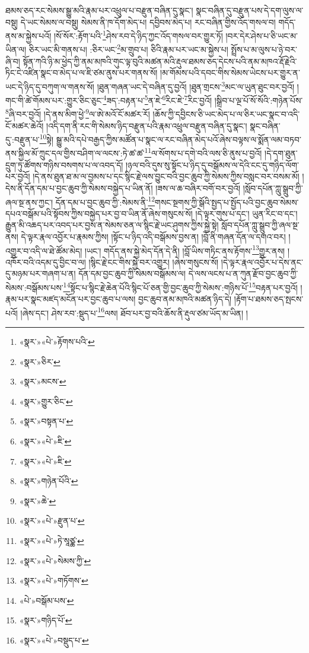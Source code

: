 ཐམས་ཅད་རང་སེམས་སྒྱུ་མའི་རྣམ་པར་འཕྲུལ་པ་བརྫུན་བཞིན་དུ་སྣང་། སྣང་བཞིན་དུ་བརྫུན་པས་དེ་དག་ལུས་ལ་བསྡུ། དེ་ཡང་སེམས་ལ་བསྡུ། སེམས་ནི་ཁ་དོག་མེད་པ། དབྱིབས་མེད་པ། རང་བཞིན་གྱིས་འོད་གསལ་བ། གདོད་ནས་མ་སྐྱེས་པའོ། །སོ་སོར་:རྟོག་པའི་\footnote{«སྣར་»«པེ་»རྟོགས་པའི་}ཤེས་རབ་དེ་ཉིད་ཀྱང་འོད་གསལ་བར་གྱུར་ཏོ། །བར་དེར་ཤེས་པ་ཅི་ཡང་མ་ཡིན་ལ། ཅིར་ཡང་མི་གནས་པ། :ཅིར་ཡང་\footnote{«སྣར་»ཅིར་}མ་གྲུབ་པ། ཅིའི་རྣམ་པར་ཡང་མ་སྐྱེས་པ། སྤྲོས་པ་མ་ལུས་པ་ཉེ་བར་ཞི་བ། སྟོན་ཀའི་ཉི་མ་ཕྱེད་ཀྱི་ནམ་མཁའི་གུང་ལྟ་བུའི་མཚན་མའི་རྡུལ་ཐམས་ཅད་དེངས་པའི་ནམ་མཁའ་རྡོ་རྗེའི་ཏིང་ངེ་འཛིན་སྣང་བ་མེད་པ་ལ་ཇི་ཙམ་ནུས་པར་གནས་སོ། །མ་གོམས་པའི་དབང་གིས་སེམས་ཡེངས་པར་གྱུར་ན་ཡང་དེ་ཉིད་དུ་བཀུག་ལ་གནས་སོ། །ཐུན་གཞན་ཡང་དེ་བཞིན་དུ་བྱའོ། །ཐུན་གྲངས་\footnote{«སྣར་»མངས་}མང་ལ་ཡུན་ཐུང་བར་བྱའོ། །གང་གི་ཚེ་གོམས་པར་:གྱུར་ཅིང་ཅུང་\footnote{«སྣར་»གྱུར་ཅིང་}ཟད་:བརྟན་པ་\footnote{«སྣར་»བསྟན་པ་}ན་ཇེ་\footnote{«སྣར་»«པེ་»ཇི་}རིང་ཇེ་\footnote{«སྣར་»«པེ་»ཇི་}རིང་བྱའོ། །སྒྲིབ་པ་ལྔ་པོ་སོ་སོའི་:གཉེན་པོས་\footnote{«སྣར་»གཉེན་པོའི་}ཞི་བར་བྱའོ། །དེ་ནས་མིག་ཕྱེ་\footnote{«སྣར་»ཆེ་}ལ་ཨེ་མའོ་ངོ་མཚར་རོ། །ཆོས་ཀྱི་དབྱིངས་ཅི་ཡང་མེད་པ་ལ་ཅིར་ཡང་སྣང་བ་འདི་ངོ་མཚར་ཆེའོ། །འདི་དག་ནི་རང་གི་སེམས་ཉིད་བརྫུན་པའི་རྣམ་འཕྲུལ་བརྫུན་བཞིན་དུ་སྣང་། སྣང་བཞིན་དུ་:བརྫུན་པ་\footnote{«སྣར་»«པེ་»རྫུན་པ་}སྟེ། སྒྱུ་མའི་དཔེ་བརྒྱད་ཀྱིས་མཚོན་པ་སྣང་ལ་རང་བཞིན་མེད་པའོ་ཞེས་བལྟས་ལ་སྨོན་ལམ་བཏབ་ནས་སྐྱིལ་མོ་ཀྲུང་དལ་གྱིས་བཤིག་ལ་ལངས་:ཏེ་ཚ་ཚ་\footnote{«སྣར་»«པེ་»ཏེ་སཱཙྪ་}ལ་སོགས་པ་དགེ་བའི་ལས་ཅི་ནུས་པ་བྱའོ། །དེ་དག་ཐུན་དྲུག་ཏུ་ཚོགས་གཉིས་བསགས་པ་ལ་འབད་དོ། །ཉལ་བའི་དུས་སུ་སྟོང་པ་ཉིད་དུ་བསྒོམས་ལ་དེའི་ངང་དུ་གཉིད་ལོག་པར་བྱའོ། །དེ་ནས་ཐུན་ཐ་མ་ལ་བྱམས་པ་དང་སྙིང་རྗེ་ལས་བྱུང་བའི་བྱང་ཆུབ་ཀྱི་སེམས་ཀྱིས་བསླང་བར་བསམ་མོ། །དེས་ནི་དོན་དམ་པ་བྱང་ཆུབ་ཀྱི་སེམས་བསྐྱེད་པ་ཡིན་ནོ། །ཟས་ལ་ཆ་བཞིར་བགོ་བར་བྱའོ། །སློབ་དཔོན་ཀླུ་སྒྲུབ་ཀྱི་ཞལ་སྔ་ནས་ཀྱང་། དོན་དམ་པ་བྱང་ཆུབ་ཀྱི་:སེམས་ནི་\footnote{«སྣར་»«པེ་»སེམས་ཀྱི་}གསང་སྔགས་ཀྱི་སྒོའི་སྤྱད་པ་སྤྱོད་པའི་བྱང་ཆུབ་སེམས་དཔའ་བསྒོམ་པའི་སྟོབས་ཀྱིས་བསྐྱེད་པར་བྱ་བ་ཡིན་ནོ་ཞེས་གསུངས་སོ། །དེ་ལྟར་གུས་པ་དང་། ཡུན་རིང་བ་དང་། རྒྱུན་མི་འཆད་པར་འབད་པར་བྱས་ན་སེམས་ཅན་ལ་སྙིང་རྗེ་ཡང་ཤུགས་ཀྱིས་སྐྱེ་སྟེ། སློབ་དཔོན་ཀླུ་སྒྲུབ་ཀྱི་ཞལ་སྔ་ནས། དེ་ལྟར་རྣལ་འབྱོར་པ་རྣམས་ཀྱིས། །སྟོང་པ་ཉིད་འདི་བསྒོམས་བྱས་ན། །བློ་ནི་གཞན་དོན་ལ་དགའ་བར། །འགྱུར་བ་འདི་ལ་ཐེ་ཚོམ་མེད། །ཡང་། གདོད་ནས་སྐྱེ་མེད་དོན་དེ་ནི། །བློ་ཡིས་གཏིང་ནས་རྟོགས་\footnote{«སྣར་»«པེ་»གཏོགས་}གྱུར་ནས། །འཁོར་བའི་འདམ་དུ་བྱིང་བ་ལ། །སྙིང་རྗེ་ངང་གིས་སྐྱེ་བར་འགྱུར། །ཞེས་གསུངས་སོ། །དེ་ལྟར་རྣལ་འབྱོར་པ་དེས་ནང་དུ་མཉམ་པར་གཞག་པ་ན། དོན་དམ་བྱང་ཆུབ་ཀྱི་སེམས་བསྒོམས་ལ། དེ་ལས་ལངས་པ་ན་ཀུན་རྫོབ་བྱང་ཆུབ་ཀྱི་སེམས་:བསྒོམས་པས་\footnote{«པེ་»བསྒོམ་པས་}སྟོང་པ་སྙིང་རྗེ་ཆེན་པོའི་སྙིང་པོ་ཅན་གྱི་བྱང་ཆུབ་ཀྱི་སེམས་:གཉིས་པོ་\footnote{«སྣར་»གཉིད་པོ་}བརྟན་པར་བྱའོ། །རྣམ་པར་སྣང་མཛད་མངོན་པར་བྱང་ཆུབ་པ་ལས། བྱང་ཆུབ་ནམ་མཁའི་མཚན་ཉིད་དེ། །རྟོག་པ་ཐམས་ཅད་སྤངས་པའོ། །ཞེས་དང་། ཤེས་རབ་:སྡུད་པ་\footnote{«སྣར་»«པེ་»བསྡུད་པ་}ལས། ཐོབ་པར་བྱ་བའི་ཆོས་ནི་རྡུལ་ཙམ་ཡོད་མ་ཡིན། །
